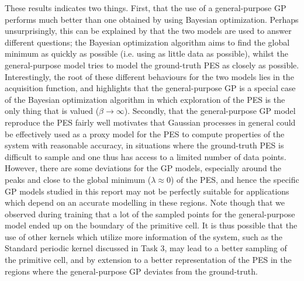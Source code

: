 \documentclass[11pt,a4paper]{article}
\begin{document}
These results indicates two things. First, that the use of a general-purpose GP performs much better than one obtained by using Bayesian optimization. Perhaps unsurprisingly, this can be explained by that the two models are used to answer different questions; the Bayesian optimization algorithm aims to find the global minimum as quickly as possible (i.e. using as little data as possible), whilst the general-purpose model tries to model the ground-truth PES as closely as possible. Interestingly, the root of these different behaviours for the two models lies in the acquisition function, and highlights that the general-purpose GP is a special case of the Bayesian optimization algorithm in which exploration of the PES is the only thing that is valued ($\beta \rightarrow\infty$). Secondly, that the general-purpose GP model reproduce the PES fairly well motivates that Gaussian processes in general could be effectively used as a proxy model for the PES to compute properties of the system with reasonable accuracy, in situations where the ground-truth PES is difficult to sample and one thus has access to a limited number of data points. However, there are some deviations for the GP models, especially around the peaks and close to the global minimum ($\lambda\approx 0$) of the PES, and hence the specific GP models studied in this report may not be perfectly suitable for applications which depend on an accurate modelling in these regions. Note though that we observed during training that a lot of the sampled points for the general-purpose model ended up on the boundary of the primitive cell. It is thus possible that the use of other kernels which utilize more information of the system, such as the Standard periodic kernel discussed in Task 3, may lead to a better sampling of the primitive cell, and by extension to a better representation of the PES in the regions where the general-purpose GP deviates from the ground-truth.


\printbibliography
\end{document}
